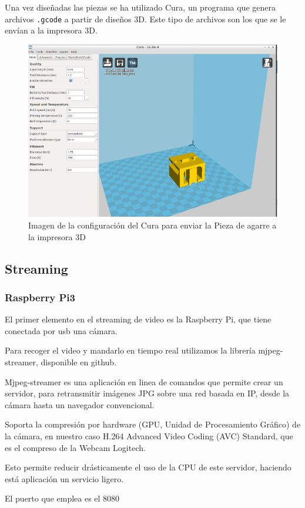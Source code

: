 \documentclass[twoside, 12pt]{epstfg}
\begin{document}
Una vez diseñadas las piezas se ha utilizado Cura, un programa que genera archivos \texttt{.gcode} a partir de diseños 3D. Este tipo de archivos son los que se le envían a la impresora 3D.

\begin{figure}[h]
	\centerline{
		\mbox{\includegraphics[width=.75\textwidth]{images/Cura2.png}}
	}
	\caption{Imagen de la configuración del Cura para enviar la Pieza de agarre a la impresora 3D}
\end{figure}
 
\newpage
\subsection{Streaming}
\subsubsection{Raspberry Pi3}
El primer elemento en el streaming de video es la Raspberry Pi, que tiene conectada por usb una cámara.

Para recoger el video y mandarlo en tiempo real utilizamos la librería mjpeg-streamer, disponible en github.

Mjpeg-streamer es una aplicación en linea de comandos que permite crear un servidor, para retransmitir imágenes JPG sobre una red basada en IP, desde la cámara hasta un navegador convencional.

Soporta la compresión por hardware (GPU, Unidad de Procesamiento Gráfico) de la cámara, en nuestro caso H.264 Advanced Video Coding (AVC) Standard, que es el compreso de la Webcam Logitech.

Esto permite reducir drásticamente el uso de la CPU de este servidor, haciendo está aplicación un servicio ligero.

El puerto que emplea es el 8080
\end{document}
